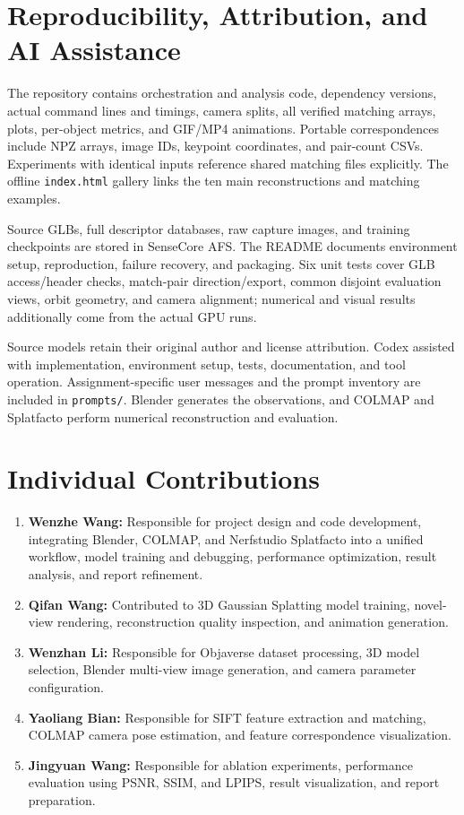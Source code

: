 \documentclass{article}
\begin{document}
\section{Reproducibility, Attribution, and AI Assistance}
The repository contains orchestration and analysis code, dependency versions, actual command lines and timings, camera splits, all verified matching arrays, plots, per-object metrics, and GIF/MP4 animations. Portable correspondences include NPZ arrays, image IDs, keypoint coordinates, and pair-count CSVs. Experiments with identical inputs reference shared matching files explicitly. The offline \texttt{index.html} gallery links the ten main reconstructions and matching examples.

Source GLBs, full descriptor databases, raw capture images, and training checkpoints are stored in SenseCore AFS. The README documents environment setup, reproduction, failure recovery, and packaging. Six unit tests cover GLB access/header checks, match-pair direction/export, common disjoint evaluation views, orbit geometry, and camera alignment; numerical and visual results additionally come from the actual GPU runs.

Source models retain their original author and license attribution. Codex assisted with implementation, environment setup, tests, documentation, and tool operation. Assignment-specific user messages and the prompt inventory are included in \texttt{prompts/}. Blender generates the observations, and COLMAP and Splatfacto perform numerical reconstruction and evaluation.

\section{Individual Contributions}
\begin{enumerate}
\item \textbf{Wenzhe Wang:} Responsible for project design and code development, integrating Blender, COLMAP, and Nerfstudio Splatfacto into a unified workflow, model training and debugging, performance optimization, result analysis, and report refinement.
\item \textbf{Qifan Wang:} Contributed to 3D Gaussian Splatting model training, novel-view rendering, reconstruction quality inspection, and animation generation.
\item \textbf{Wenzhan Li:} Responsible for Objaverse dataset processing, 3D model selection, Blender multi-view image generation, and camera parameter configuration.
\item \textbf{Yaoliang Bian:} Responsible for SIFT feature extraction and matching, COLMAP camera pose estimation, and feature correspondence visualization.
\item \textbf{Jingyuan Wang:} Responsible for ablation experiments, performance evaluation using PSNR, SSIM, and LPIPS, result visualization, and report preparation.
\end{enumerate}
\end{document}
